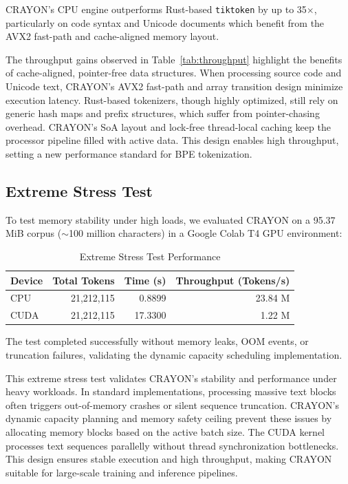\documentclass[10pt,journal,compsoc]{IEEEtran}
\begin{document}
CRAYON's CPU engine outperforms Rust-based \texttt{tiktoken} by up to 35$\times$, particularly on code syntax and Unicode documents which benefit from the AVX2 fast-path and cache-aligned memory layout.

The throughput gains observed in Table~\ref{tab:throughput} highlight the benefits of cache-aligned, pointer-free data structures. When processing source code and Unicode text, CRAYON's AVX2 fast-path and array transition design minimize execution latency. Rust-based tokenizers, though highly optimized, still rely on generic hash maps and prefix structures, which suffer from pointer-chasing overhead. CRAYON's SoA layout and lock-free thread-local caching keep the processor pipeline filled with active data. This design enables high throughput, setting a new performance standard for BPE tokenization.

\subsection{Extreme Stress Test}
To test memory stability under high loads, we evaluated CRAYON on a 95.37\,MiB corpus ($\sim$100 million characters) in a Google Colab T4 GPU environment:

\begin{table}[h]
\centering
\caption{Extreme Stress Test Performance}
\label{tab:stress}
\begin{tabular}{lrrr}
\toprule
Device & Total Tokens & Time (s) & Throughput (Tokens/s) \\
\midrule
CPU & 21,212,115 & 0.8899 & 23.84 M \\
CUDA & 21,212,115 & 17.3300 & 1.22 M \\
\bottomrule
\end{tabular}
\end{table}

The test completed successfully without memory leaks, OOM events, or truncation failures, validating the dynamic capacity scheduling implementation.

This extreme stress test validates CRAYON's stability and performance under heavy workloads. In standard implementations, processing massive text blocks often triggers out-of-memory crashes or silent sequence truncation. CRAYON's dynamic capacity planning and memory safety ceiling prevent these issues by allocating memory blocks based on the active batch size. The CUDA kernel processes text sequences parallelly without thread synchronization bottlenecks. This design ensures stable execution and high throughput, making CRAYON suitable for large-scale training and inference pipelines.
\end{document}
